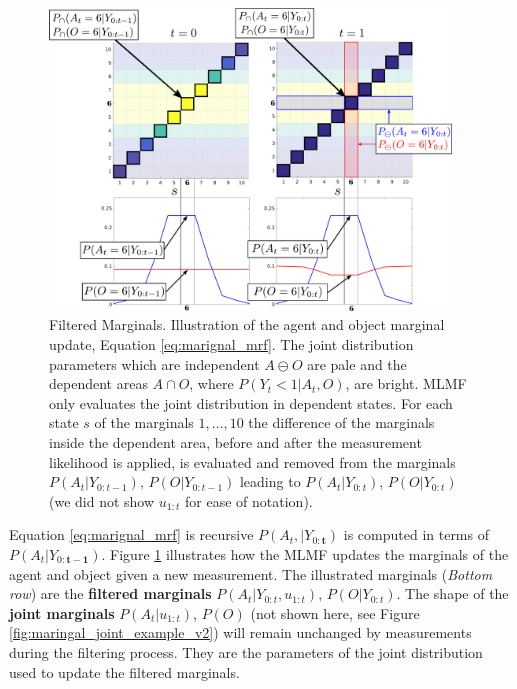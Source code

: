 \begin{figure}
\centering
\includegraphics[width=0.95\textwidth]{./ch5-MLMF/Figures/explenation/marginal_cal_example.pdf}
\caption{Filtered Marginals. Illustration of the agent and object marginal update, Equation \ref{eq:marignal_mrf}. The joint 
distribution parameters which are independent $A \ominus O$ are pale and the dependent areas $A \cap O$, where $P(Y_t<1|A_t,O)$, are bright. MLMF only
evaluates the joint distribution in dependent states. For each state $s$ of the marginals $1,\dots,10$ the difference 
of the marginals inside the dependent area, before and after the measurement likelihood is applied, is evaluated and removed from the marginals 
$P(A_t|Y_{0:t-1})$, $P(O|Y_{0:t-1})$ leading to $P(A_t|Y_{0:t})$, $P(O|Y_{0:t})$ (we did not show $u_{1:t}$ for ease of notation). }
\label{fig:ch5:marginal_update}
\end{figure}

Equation \ref{eq:marignal_mrf} is recursive $P(A_t,|Y_{0:\mathbf{t}})$ is computed in terms of $P(A_t|Y_{0:\mathbf{t-1}})$. 
Figure \ref{fig:ch5:marginal_update} illustrates how the MLMF updates the marginals of the agent and object given a new measurement.
The illustrated marginals (\textit{Bottom row}) are the \textbf{filtered marginals} $P(A_t|Y_{0:t},u_{1:t})$, $P(O|Y_{0:t})$. The shape of the \textbf{joint marginals} $P(A_t|u_{1:t})$, $P(O)$
(not shown here, see Figure \ref{fig:maringal_joint_example_v2}) will remain unchanged by measurements during the filtering process. They are the parameters of the joint distribution used to 
update the filtered marginals.


